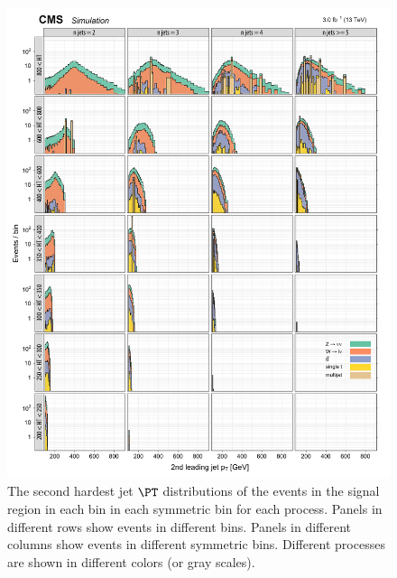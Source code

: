 \begin{figure}[!h]
\centering
\includegraphics[scale=0.95]{figures/kiplots/c150107_s150318_f015_jet_pt_1_100}
\caption{The second hardest jet $\PT$ distributions of the events in
the signal region in each \scalht bin in each symmetric \njet bin for
each process. Panels in different rows show events in different
\scalht bins. Panels in different columns show events in different
symmetric \njet bins. Different processes are shown in different
colors (or gray scales).} \label{c150107_s150318_f015_jet_pt_1_100}
\end{figure}

